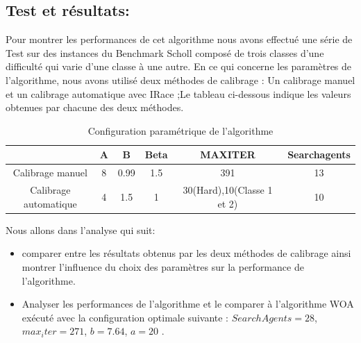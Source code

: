 \documentclass[12pt]{article}
\begin{document}
\subsection{Test et résultats:}
Pour montrer les performances de cet algorithme nous avons effectué une série de Test sur des instances du Benchmark \guillemotleft Scholl \guillemotright composé de trois classes d’une difficulté qui varie d’une classe à une autre.
En ce qui concerne les paramètres de l’algorithme, nous avons utilisé deux méthodes de calibrage : Un calibrage manuel et un calibrage automatique avec IRace ;Le tableau ci-dessous indique les valeurs obtenues par chacune des deux méthodes.
\begin{table}[h!]
    \begin{center}
      \caption{Configuration paramétrique de l'algorithme}
      \label{tab:table1}
      \begin{tabular}{c|c|c|c|c|c} %
       \textbf{}&\textbf{A} & \textbf{B} &\textbf{Beta} & \textbf{MAXITER} & \textbf{Searchagents} \\
        \hline
        
        Calibrage manuel &8&0.99&1.5&391&13\\ 
        \hline
       Calibrage automatique&4&1.5&1&30(Hard),10(Classe 1 et 2)&10\\
        \hline
      \end{tabular}
    \end{center}
  \end{table}
\linebreak
 Nous allons dans l’analyse qui suit:
\begin{itemize}
    \item comparer entre les résultats obtenus par les deux méthodes de calibrage ainsi montrer l’influence du choix des paramètres sur la performance de l’algorithme.
    \item Analyser les performances de l’algorithme et le comparer à l’algorithme WOA exécuté avec la configuration optimale suivante : $Search Agents=28$, $max_iter=271$,  $b=7.64$, $a=20$ .
\end{itemize}
\end{document}

